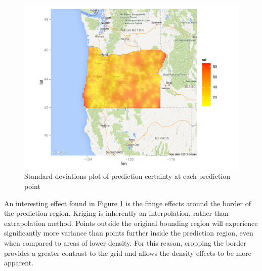 \documentclass[12pt,twoside]{reedthesis}
\begin{document}
\begin{figure}[h]
	   
	       \centering
	  
	    \includegraphics[scale=0.9]{sd_plot}
	
	     \caption{Standard deviations plot of prediction certainty at each prediction point}
	 \label{sd}
	\end{figure}
	
	   
	  
	
	
	
An interesting effect found in Figure \ref{sd} is the fringe effects around the border of the prediction region. Kriging is inherently an interpolation, rather than extrapolation method. Points outside the original bounding region will experience significantly more variance than points further inside the prediction region, even when compared to areas of lower density. For this reason, cropping the border provides a greater contrast to the grid and allows the density effects to be more apparent.
	
\end{document}
